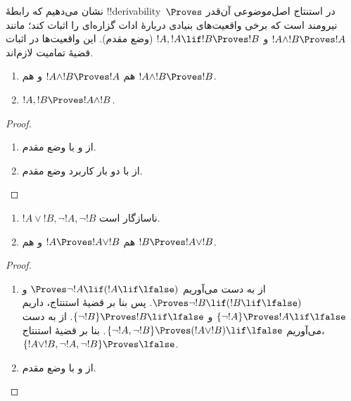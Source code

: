 \documentclass[../../../include/open-logic-section]{subfiles}
\begin{document}
      {}
      {}


\begin{explain}
  نشان می‌دهیم که رابطهٔ !!{derivability}~$\Proves$ در استنتاج
  اصل‌موضوعی آن‌قدر نیرومند است که برخی واقعیت‌های بنیادی دربارهٔ ادات
  گزاره‌ای را اثبات کند؛ مانند $!A \land !B \Proves !A$ و
  $!A, !A \lif !B \Proves !B$ (وضع مقدم). این واقعیت‌ها در اثبات قضیهٔ
  تمامیت لازم‌اند.
\end{explain}

\begin{prop}
  \begin{enumerate}
  \item {} هم
    $!A \land !B \Proves !A$ و هم $!A \land !B \Proves !B$.
  \item {} $!A, !B \Proves !A \land !B$.
  \end{enumerate}
\end{prop}

\begin{proof}
  \begin{enumerate}
    \item از  و  با وضع مقدم.
  \item از  با دو بار کاربرد وضع مقدم.
  \end{enumerate}
\end{proof}


\begin{prop}
  \begin{enumerate}
  \item $!A \lor !B, \lnot !A, \lnot !B$ ناسازگار است.
  \item هم $!A \Proves !A \lor !B$ و هم $!B \Proves !A \lor !B$.
  \end{enumerate}
\end{prop}

\begin{proof}
  \begin{enumerate}
  \item از  به دست می‌آوریم
    $\Proves \lnot !A \lif (!A \lif \lfalse)$ و
    $\Proves \lnot !B \lif (!B \lif \lfalse)$. پس بنا بر قضیهٔ
    استنتاج، داریم $\{\lnot !A\} \Proves !A \lif \lfalse$ و
    $\{\lnot !B\} \Proves !B \lif \lfalse$. از
     به دست می‌آوریم
    $\{\lnot !A, \lnot !B\} \Proves (!A \lor !B) \lif \lfalse$.
    بنا بر قضیهٔ استنتاج،
    $\{!A \lor !B, \lnot !A, \lnot !B\} \Proves \lfalse$.
  \item از  و  با وضع مقدم.
  \end{enumerate}
\end{proof}
\end{document}
